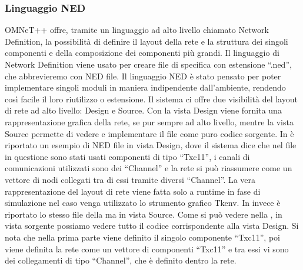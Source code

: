 \subsubsection{Linguaggio NED}
OMNeT++ offre, tramite un linguaggio ad alto livello chiamato Network Definition, la possibilità di definire il layout della rete e la struttura dei singoli componenti e della composizione dei componenti più grandi. Il linguaggio di Network Definition viene usato per creare file di specifica con estensione “.ned”, che abbrevieremo con NED file. Il linguaggio NED è stato pensato per poter implementare singoli moduli in maniera indipendente dall'ambiente, rendendo così facile il loro riutilizzo o estensione. Il sistema ci offre due visibilità del layout di rete ad alto livello: Design e Source. Con la vista Design viene fornita una rappresentazione grafica della rete, se pur sempre ad alto livello, mentre la vista Source permette di vedere e implementare il file come puro codice sorgente. In  è riportato un esempio di NED file in vista Design, dove il sistema dice che nel file in questione sono stati usati componenti di tipo “Txc11”, i canali di comunicazioni utilizzati sono dei “Channel” e la rete si può riassumere come un vettore di nodi collegati tra di essi tramite diversi “Channel”. La vera rappresentazione del layout di rete viene fatta solo a runtime in fase di simulazione nel caso venga utilizzato lo strumento grafico Tkenv. In  invece è riportato lo stesso file della  ma in vista Source. Come si può vedere nella , in vista sorgente possiamo vedere tutto il codice corrispondente alla vista Design. Si nota che nella prima parte viene definito il singolo componente “Txc11”, poi viene definita la rete come un vettore di componenti “Txc11” e tra essi vi sono dei collegamenti di tipo “Channel”, che è definito dentro la rete.
\bigskip

